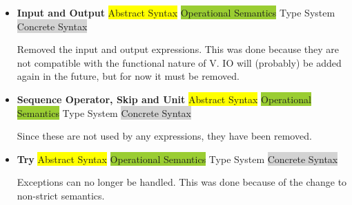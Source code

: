 \documentclass{article}
\begin{document}
\begin{itemize}
  \item \textbf{Input and Output} \; \; {\small\colorbox{yellow}{Abstract Syntax} \colorbox{YellowGreen}{Operational Semantics} \colorbox{ProcessBlue}{Type System} \colorbox{lightgray}{Concrete Syntax}}

      Removed the input and output expressions.
      This was done because they are not compatible with the functional nature of V.
      IO will (probably) be added again in the future, but for now it must be removed.

  \item \textbf{Sequence Operator, Skip and Unit} \; \; {\small\colorbox{yellow}{Abstract Syntax} \colorbox{YellowGreen}{Operational Semantics} \colorbox{ProcessBlue}{Type System} \colorbox{lightgray}{Concrete Syntax}}

      Since these are not used by any expressions, they have been removed.

  \item \textbf{Try} \; \; {\small\colorbox{yellow}{Abstract Syntax} \colorbox{YellowGreen}{Operational Semantics} \colorbox{ProcessBlue}{Type System} \colorbox{lightgray}{Concrete Syntax}}

      Exceptions can no longer be handled.
      This was done because of the change to non-strict semantics.
\end{itemize}
\end{document}
